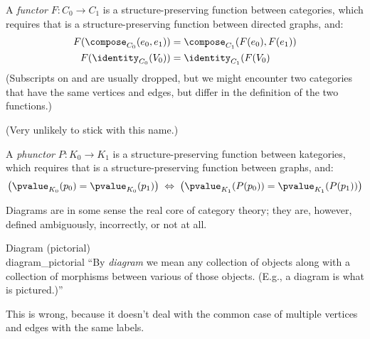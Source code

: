 \documentclass[11pt,openany]{book}
\begin{document}
\begin{definition}
A \textit{functor} $F:C_0 \rightarrow C_1$ is 
a structure-preserving function
between categories, which requires that is a structure-preserving 
function between directed graphs, and:
\begin{align*}
  F(\compose_{C_0}(e_0,e_1)) & = \compose_{C_1}(F(e_0),F(e_1))\\
  F(\identity_{C_0}(V_0)) & = \identity_{C_1}(F(V_0)
\end{align*}
  (Subscripts on \compose and \identity 
  are usually dropped, but we might 
  encounter two categories that have the same vertices and edges,
  but differ in the definition of the two functions.)
\end{definition}

\begin{definition}
(Very unlikely to stick with this name.)

A \textit{phunctor} $P:K_0 \rightarrow K_1$ is 
a structure-preserving function
between kategories, which requires that is a structure-preserving 
function between graphs, and:
\begin{align*}
  \left( \pvalue_{K_0}(p_0) = \pvalue_{K_0}(p_1) \right)
  \; \Leftrightarrow \; 
  \left( \pvalue_{K_1}(P(p_0)) = \pvalue_{K_1}(P(p_1)) \right)
\end{align*}
\end{definition}

\label{sec:Diagram}

Diagrams are in some sense the real core of category theory;
they are, however, defined ambiguously, incorrectly, or not at all.


\begin{tcbdefinition}
{Diagram (pictorial)\\
\textmd{\textcite{geroch_1985,goldblatt_1984_topoi,
hillman_2001_cat_primer}}}
{diagram_pictorial}
``By \textit{diagram} we mean any collection of objects
along with a collection of morphisms between various of those
objects. (E.g., a diagram is what is pictured.)''~\cite{geroch_1985} 
\par
This is wrong, because it doesn't deal with the common
case of multiple vertices and edges with the same labels.
\end{tcbdefinition}
\end{document}

